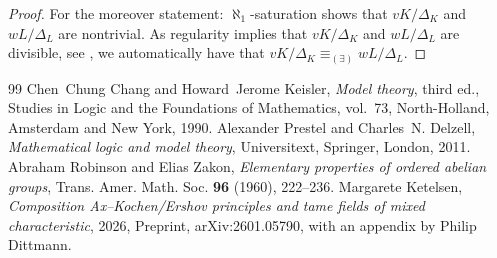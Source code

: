 \documentclass[10pt,a4paper]{amsart}
\begin{document}
\begin{proof}
        For the moreover statement: $\aleph_1$-saturation shows that $vK/\Delta_K$ and $wL/\Delta_L$ are nontrivial.
        As regularity implies that $vK/\Delta_K$ and $wL/\Delta_L$ are divisible, see
        \cite[\S 3]{Rob}, we automatically have that $vK/\Delta_K \equiv_{(\exists)} wL / \Delta_L$.
    \end{proof}

\begin{thebibliography}{99}
 Chen~Chung Chang and Howard~Jerome Keisler, \emph{Model theory}, third ed., Studies in Logic and the Foundations of Mathematics, vol.~73, North-Holland, Amsterdam and New York, 1990.
 Alexander Prestel and Charles~N. Delzell, \emph{Mathematical logic and model theory}, Universitext, Springer, London, 2011.
 Abraham Robinson and Elias Zakon, \emph{Elementary properties of ordered abelian groups}, Trans. Amer. Math. Soc. \textbf{96} (1960), 222--236.
 Margarete Ketelsen, \emph{Composition {A}x--{K}ochen/{E}rshov principles and tame fields of mixed characteristic}, 2026, Preprint, arXiv:2601.05790, with an appendix by Philip Dittmann.
\end{thebibliography}
\end{document}
